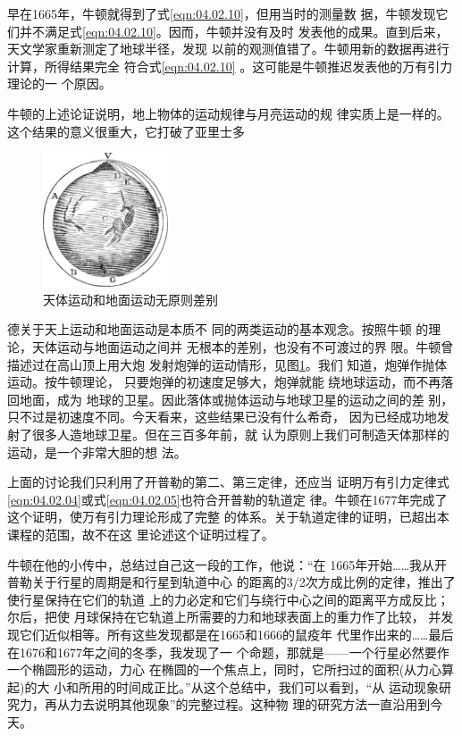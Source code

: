 早在1665年，牛顿就得到了式\eqref{eqn:04.02.10}，但用当时的测量数
据，牛顿发现它们并不满足式\eqref{eqn:04.02.10}。因而，牛顿并没有及时
发表他的成果。直到后来，天文学家重新测定了地球半径，发现
以前的观测值错了。牛顿用新的数据再进行计算，所得结果完全
符合式\eqref{eqn:04.02.10} 。这可能是牛顿推迟发表他的万有引力理论的一
个原因。

牛顿的上述论证说明，地上物体的运动规律与月亮运动的规
律实质上是一样的。这个结果的意义很重大，它打破了亚里士多
\begin{figure}
  \centering
  \includegraphics[width=10em]{figure/fig04.03}
  \caption{天体运动和地面运动无原则差别}
  \label{fig:04.03}
\end{figure}
德关于天上运动和地面运动是本质不
同的两类运动的基本观念。按照牛顿
的理论，天体运动与地面运动之间并
无根本的差别，也没有不可渡过的界
限。牛顿曾描述过在高山顶上用大炮
发射炮弹的运动情形，见图\ref{fig:04.03}。我们
知道，炮弹作抛体运动。按牛顿理论，
只要炮弹的初速度足够大，炮弹就能
绕地球运动，而不再落回地面，成为
地球的卫星。因此落体或抛体运动与地球卫星的运动之间的差
别，只不过是初速度不同。今天看来，这些结果已没有什么希奇，
因为已经成功地发射了很多人造地球卫星。但在三百多年前，就
认为原则上我们可制造天体那样的运动，是一个非常大胆的想
法。

上面的讨论我们只利用了开普勒的第二、第三定律，还应当
证明万有引力定律式\eqref{eqn:04.02.04}或式\eqref{eqn:04.02.05}也符合开普勒的轨道定
律。牛顿在1677年完成了这个证明，使万有引力理论形成了完整
的体系。关于轨道定律的证明，已超出本课程的范围，故不在这
里论述这个证明过程了。

牛顿在他的小传中，总结过自己这一段的工作，他说：“在
1665年开始……我从开普勒关于行星的周期是和行星到轨道中心
的距离的3/2次方成比例的定律，推出了使行星保持在它们的轨道
上的力必定和它们与绕行中心之间的距离平方成反比；尔后，把使
月球保持在它轨道上所需要的力和地球表面上的重力作了比较，
并发现它们近似相等。所有这些发现都是在1665和1666的鼠疫年
代里作出来的……最后在1676和1677年之间的冬季，我发现了一
个命题，那就是——一个行星必然要作一个椭圆形的运动，力心
在椭圆的一个焦点上，同时，它所扫过的面积(从力心算起)的大
小和所用的时间成正比。”从这个总结中，我们可以看到，“从
运动现象研究力，再从力去说明其他现象”的完整过程。这种物
理的研究方法一直沿用到今天。
